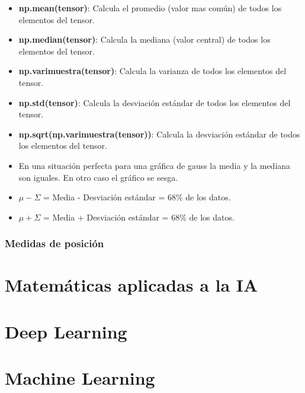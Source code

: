 \documentclass{templateNote}
\begin{document}
\begin{itemize}
    \item \textbf{np.mean(tensor)}: Calcula el promedio (valor mas común) de todos los elementos del tensor.
    \item \textbf{np.median(tensor)}: Calcula la mediana (valor central) de todos los elementos del tensor.
    \item \textbf{np.varimuestra(tensor)}: Calcula la varianza de todos los elementos del tensor.
    \item \textbf{np.std(tensor)}: Calcula la desviación estándar de todos los elementos del tensor.
    \item \textbf{np.sqrt(np.varimuestra(tensor))}: Calcula la desviación estándar de todos los elementos del tensor.
    \item En una situación perfecta para una gráfica de gauss la media y la mediana son iguales. En otro caso el gráfico se sesga.
    \item $\mu - \Sigma$ = Media - Desviación estándar = 68\% de los datos.
    \item $\mu + \Sigma$ = Media + Desviación estándar = 68\% de los datos.
\end{itemize}

\subsubsection*{Medidas de posición}




\newpage
\section{Matemáticas aplicadas a la IA}

\newpage
\section{Deep Learning}

\newpage
\section{Machine Learning}
\end{document}
